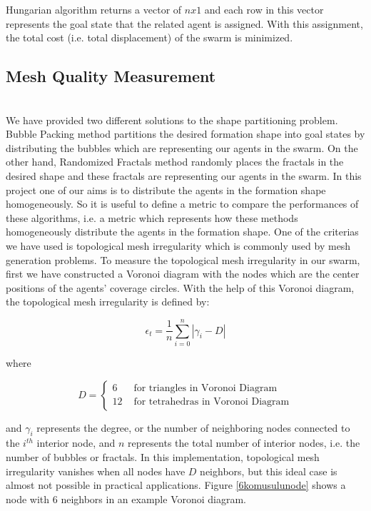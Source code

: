 Hungarian algorithm returns a vector of $nx1$ and each row in this vector represents the goal state that the related agent is assigned. With this assignment, the total cost (i.e. total displacement) of the swarm is minimized. 
\subsection{Mesh Quality Measurement}\hspace{0pt} \label{mesh_quality_ref}  \\
We have provided two different solutions to the shape partitioning problem. Bubble Packing method partitions the desired formation shape into goal states by distributing the bubbles which are representing our agents in the swarm. On the other hand, Randomized Fractals method randomly places the fractals in the desired shape and these fractals are representing our agents in the swarm. In this project one of our aims is to distribute the agents in the formation shape homogeneously. So it is useful to define a metric to compare the performances of these algorithms, i.e. a metric which represents how these methods homogeneously distribute the agents in the formation shape. One of the criterias we have used is topological mesh irregularity \cite{27} which is commonly used by mesh generation problems. To measure the topological mesh irregularity in our swarm, first we have constructed a Voronoi diagram with the nodes which are the center positions of the agents' coverage circles. With the help of this Voronoi diagram, the topological mesh irregularity is defined by:

\begin{equation}
\epsilon _t = \frac{1}{n} \sum_{i = 0}^{n} |\gamma _i - D|
\end{equation}
	
where 

\begin{equation}
D = \left\{ \begin{array}{rl}
6                               &\mbox{ for triangles in Voronoi Diagram} \\
12                             &\mbox{ for tetrahedras in Voronoi Diagram}
\end{array} \right.
\end{equation}
	
and $\gamma _i$ represents the degree, or the number of neighboring nodes connected to the $i^{th}$ interior node, and $n$ represents the total number of interior nodes, i.e. the number of bubbles or fractals. In this implementation, topological mesh irregularity vanishes when all nodes have $D$ neighbors, but this ideal case is almost not possible in practical applications. Figure \ref{6komusulunode} shows a node with 6 neighbors in an example Voronoi diagram.
	
